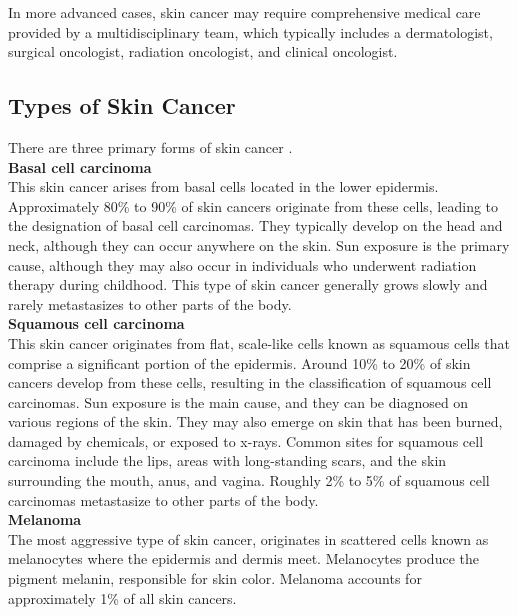 In more advanced cases, skin cancer may require comprehensive medical care provided by a multidisciplinary team, which typically includes a dermatologist, surgical oncologist, radiation oncologist, and clinical oncologist.

\subsection{Types of Skin Cancer}

There are three primary forms of skin cancer \cite{BaseCancerKnowledge}. \\

\vspace{0.5cm}
\textbf{Basal cell carcinoma} \\

This skin cancer arises from basal cells located in the lower epidermis. Approximately 80\% to 90\% of skin cancers originate from these cells, leading to the designation of basal cell carcinomas. They typically develop on the head and neck, although they can occur anywhere on the skin. Sun exposure is the primary cause, although they may also occur in individuals who underwent radiation therapy during childhood. This type of skin cancer generally grows slowly and rarely metastasizes to other parts of the body. \\

\vspace{0.5cm}
\textbf{Squamous cell carcinoma} \\

This skin cancer originates from flat, scale-like cells known as squamous cells that comprise a significant portion of the epidermis. Around 10\% to 20\% of skin cancers develop from these cells, resulting in the classification of squamous cell carcinomas. Sun exposure is the main cause, and they can be diagnosed on various regions of the skin. They may also emerge on skin that has been burned, damaged by chemicals, or exposed to x-rays. Common sites for squamous cell carcinoma include the lips, areas with long-standing scars, and the skin surrounding the mouth, anus, and vagina. Roughly 2\% to 5\% of squamous cell carcinomas metastasize to other parts of the body. \\

\vspace{0.5cm}
\textbf{Melanoma} \\

The most aggressive type of skin cancer, originates in scattered cells known as melanocytes where the epidermis and dermis meet. Melanocytes produce the pigment melanin, responsible for skin color. Melanoma accounts for approximately 1\% of all skin cancers. 

